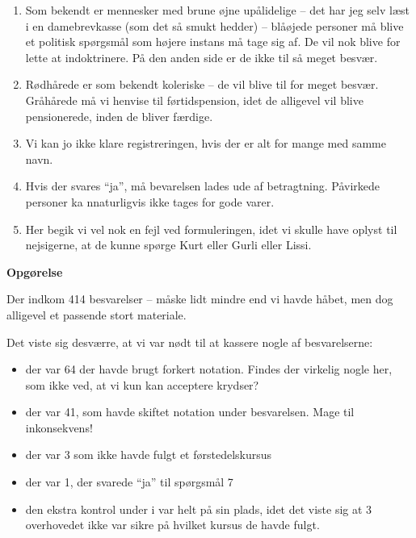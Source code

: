 \documentclass[a4paper,11pt]{article}
\begin{document}
\begin{sketch}
\begin{enumerate}
\item Som bekendt er mennesker med brune øjne upålidelige -- det har
  jeg selv læst i en damebrevkasse (som det så smukt hedder) --
  blåøjede personer må blive et politisk spørgsmål som højere instans
  må tage sig af.  De vil nok blive for lette at indoktrinere.  På den
  anden side er de ikke til så meget besvær.

\item Rødhårede er som bekendt koleriske -- de vil blive til for meget
  besvær.  Gråhårede må vi henvise til førtidspension, idet de
  alligevel vil blive pensionerede, inden de bliver færdige.

\item Vi kan jo ikke klare registreringen, hvis der er alt for mange
  med samme navn.

\item Hvis der svares "`ja"', må bevarelsen lades ude af betragtning.
  Påvirkede personer ka nnaturligvis ikke tages for gode varer.

\item Her begik vi vel nok en fejl ved formuleringen, idet vi skulle
  have oplyst til nejsigerne, at de kunne spørge Kurt eller Gurli
  eller Lissi.
\end{enumerate}

\textbf{Opgørelse}

Der indkom 414 besvarelser -- måske lidt mindre end vi havde håbet,
men dog alligevel et passende stort materiale.

Det viste sig desværre, at vi var nødt til at kassere nogle af
besvarelserne:

\begin{itemize}
\item der var 64 der havde brugt forkert notation.  Findes der
  virkelig nogle her, som ikke ved, at vi kun kan acceptere krydser?

\item der var 41, som havde skiftet notation under besvarelsen.  Mage
  til inkonsekvens!

\item der var 3 som ikke havde fulgt et førstedelskursus

\item der var 1, der svarede "`ja"' til spørgsmål 7

\item den ekstra kontrol under i var helt på sin plads, idet det viste
  sig at 3 overhovedet ikke var sikre på hvilket kursus de havde
  fulgt.


\end{itemize}
\end{sketch}
\end{document}

